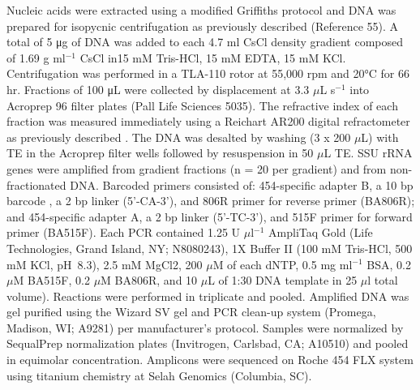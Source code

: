 Nucleic acids were extracted using a modified Griffiths protocol \citep{Griffiths_2000}
and DNA was prepared for isopycnic centrifugation as previously described
(Reference 55). A total of 5 μg of DNA was added to each 4.7 ml CsCl density
gradient composed of 1.69 g ml$^{-1}$ CsCl in15 mM Tris-HCl, 15 mM EDTA, 15 mM KCl.
Centrifugation was performed in a TLA-110 rotor at 55,000 rpm and 20°C for 66
hr. Fractions of 100 μL were collected by displacement at 3.3 $\mu$L s$^{-1}$
\citep{Manefield_2002} into Acroprep 96 filter plates (Pall Life Sciences 5035).
The refractive index of each fraction was measured immediately using a Reichart
AR200 digital refractometer as previously described
\citep{Buckley_2007}. The DNA was desalted by washing (3 x 200
$\mu$L) with TE in the Acroprep filter wells followed by resuspension in 50
$\mu$L TE. SSU rRNA genes were amplified from gradient fractions (n = 20 per
gradient) and from non-fractionated DNA. Barcoded primers consisted of:
454-specific adapter B, a 10 bp barcode \citep{Hamady_2008},
a 2 bp linker (5’-CA-3’), and 806R primer for reverse primer (BA806R); and
454-specific adapter A, a 2 bp linker (5’-TC-3’), and 515F primer for forward
primer (BA515F). Each PCR contained 1.25 U $\mu$l$^{-1}$ AmpliTaq Gold (Life
Technologies, Grand Island, NY; N8080243), 1X Buffer II (100 mM Tris-HCl, 500
mM KCl, pH~8.3), 2.5 mM MgCl2, 200 $\mu$M of each dNTP, 0.5 mg ml$^{-1}$ BSA,
0.2 $\mu$M BA515F, 0.2 $\mu$M BA806R, and 10 $\mu$L of 1:30 DNA template in 25
$\mu$l total volume). Reactions were performed in triplicate and pooled.
Amplified DNA was gel purified using the Wizard SV gel and PCR clean-up
system (Promega, Madison, WI; A9281) per manufacturer’s protocol. Samples
were normalized by SequalPrep normalization plates (Invitrogen, Carlsbad, CA;
A10510) and pooled in equimolar concentration. Amplicons were sequenced on
Roche 454 FLX system using titanium chemistry at Selah Genomics (Columbia,
SC). 

